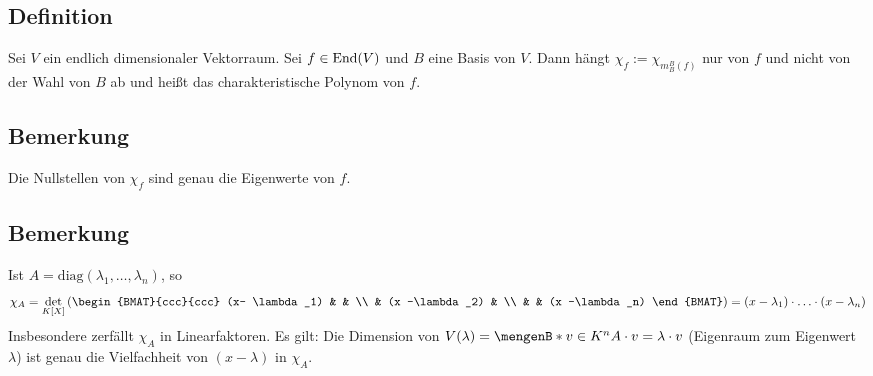 \subsection[Definition: chrakteristisches Polynom einer Abbildung $f$]{Definition} %
\label{sub:65}
Sei $V$ ein endlich dimensionaler Vektorraum. Sei $f \in \operatorname{End}(V)$ und $B$ eine Basis von $V$. Dann hängt $\chi_f := \chi_{m_B^B(f)}$ nur von $f$ und nicht von der 
Wahl von $B$ ab und heißt das charakteristische Polynom von $f$.

\subsection[Bemerkung über Nullstellen und Eigenwerte]{Bemerkung} %
\label{sub:66}
Die Nullstellen von $\chi_f$ sind genau die Eigenwerte von $f$.

\subsection[Bemerkung über das charakt. Polynom einer Diagonalmatrix]{Bemerkung} %
\label{sub:67}
Ist $A = \text{diag}(\lambda_1 ,\ldots , \lambda_n) $, so 
\[
	\chi_A = \det_{K[X]} \left(\begin{BMAT}{ccc}{ccc}
		(x- \lambda_1) & & \\
		& (x -\lambda_2) & \\
		& & (x -\lambda_n)
	\end{BMAT} \right)= (x-\lambda_1) \cdot  \ldots  \cdot (x -\lambda_n)
\]
Insbesondere zerfällt $\chi_A$ in Linearfaktoren. Es gilt: Die Dimension von $V(\lambda) = \set[v \in K^n]{A \cdot v = \lambda \cdot v}$ 
(Eigenraum zum Eigenwert $\lambda $)  ist genau die Vielfachheit von $(x- \lambda )$ in $\chi_A$.

